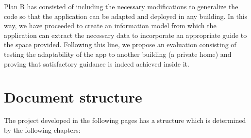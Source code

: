 Plan B has consisted of including the necessary modifications to generalize the code so that the application can be adapted and deployed in any building. In this way, we have proceeded to create an information model from which the application can extract the necessary data to incorporate an appropriate guide to the space provided. Following this line, we propose an evaluation consisting of testing the adaptability of the app to another building (a private home) and proving that satisfactory guidance is indeed achieved inside it.


\section{Document structure}
\label{sec:documEstruc}

The project developed in the following pages has a structure which is determined by the following chapters:

